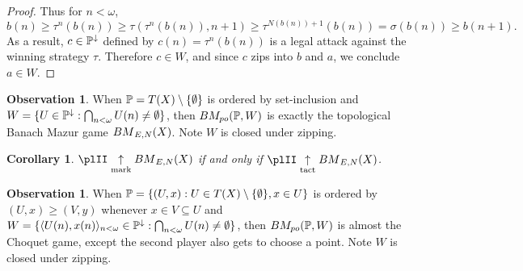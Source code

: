 \documentclass[11pt]{article}
\theoremstyle{plain}
\newtheorem{corollary}[theorem]{Corollary}
\theoremstyle{definition}
\newtheorem{observation}[theorem]{Observation}
\theoremstyle{remark}
\theoremstyle{plain}
\theoremstyle{definition}
\theoremstyle{remark}
\newcommand{\bmPoGame}[2]{BM_{po}(#1,#2)}
\begin{document}
\begin{proof}
    Thus for \(n<\omega\),
    \[
      b(n)
        \geq
      \tau^{n}(b(n))
        \geq
      \tau(\tau^{n}(b(n)),n+1)
        \geq
      \tau^{N(b(n))+1}(b(n))
        =
      \sigma(b(n))
        \geq
      b(n+1)
    .\]
    As a result, \(c\in\mathbb{P}^\downarrow\) defined by \(c(n)=\tau^n(b(n))\)
    is a legal attack against the winning strategy \(\tau\). Therefore
    \(c\in W\), and since \(c\) zips into \(b\) and \(a\), we conclude
    \(a\in W\).
  \end{proof}

  \begin{observation}
    When \(\mathbb{P}=T(X)\setminus\{\emptyset\}\) is ordered by set-inclusion
    and \(W=\{U\in\mathbb{P}^\downarrow:\bigcap_{n<\omega}U(n)\not=\emptyset\}\),
    then \(\bmPoGame{\mb P}{W}\) is exactly the topological Banach Mazur game
    \({BM}_{E,N}(X)\). Note \(W\) is closed under zipping.
  \end{observation}

  \begin{corollary}
  \(\plII\markwin\bmGame{X}\) if and only if
  \(\plII\tactwin\bmGame{X}\).
  \end{corollary}

  \begin{observation}
    When \(\mathbb{P}=\{(U,x):U\in T(X)\setminus\{\emptyset\},x\in U\}\)
    is ordered by \((U,x)\geq(V,y)\) whenever \(x\in V\subseteq U\)
    and \(W=\{\langle U(n),x(n)\rangle_{n<\omega}\in\mathbb{P}^\downarrow:\bigcap_{n<\omega}U(n)\not=\emptyset\}\),
    then \(\bmPoGame{\mb P}{W}\) is almost the Choquet game, except the second
    player also gets to choose a point. Note \(W\) is closed under zipping.
  \end{observation}

  
  
\end{document}
